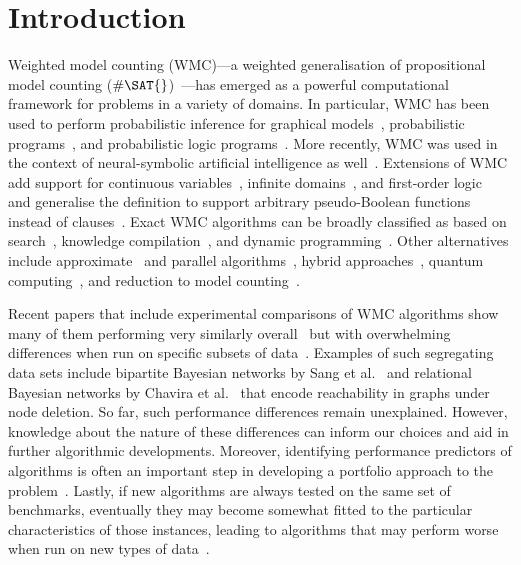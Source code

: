 \documentclass[runningheads]{llncs}
\begin{document}
\section{Introduction}

Weighted model counting (\textsf{WMC})---a weighted generalisation of
propositional model counting
($\#\SAT{}$)~\cite{DBLP:journals/ai/ChaviraD08}---has emerged as a powerful
computational framework for problems in a variety of domains. In particular,
\textsf{WMC} has been used to perform probabilistic inference for graphical
models~\cite{DBLP:conf/ecai/BartKLM16,DBLP:conf/ijcai/ChaviraD05,DBLP:conf/sat/ChaviraD06,DBLP:conf/kr/Darwiche02,DBLP:conf/aaai/SangBK05},
probabilistic programs~\cite{DBLP:journals/pacmpl/HoltzenBM20}, and
probabilistic logic programs~\cite{DBLP:journals/tplp/FierensBRSGTJR15}. More
recently, \textsf{WMC} was used in the context of neural-symbolic artificial
intelligence as well~\cite{DBLP:conf/icml/XuZFLB18}. Extensions of \textsf{WMC}
add support for continuous variables~\cite{DBLP:conf/ijcai/BellePB15}, infinite
domains~\cite{DBLP:conf/aaai/Belle17}, and first-order
logic~\cite{DBLP:journals/cacm/GogateD16,DBLP:conf/ijcai/BroeckTMDR11} and
generalise the definition to support arbitrary pseudo-Boolean functions instead
of clauses~\cite{DBLP:conf/sat/DilkasB21}. Exact \textsf{WMC} algorithms can be
broadly classified as based on
search~\cite{DBLP:conf/sat/SangBBKP04,DBLP:conf/ijcai/SharmaRSM19}, knowledge
compilation~\cite{DBLP:conf/ecai/Darwiche04,DBLP:conf/ijcai/LagniezM17,DBLP:conf/ijcai/OztokD15},
and dynamic programming~\cite{DBLP:conf/aaai/DudekPV20,DBLP:conf/cp/DudekPV20}.
Other alternatives include
approximate~\cite{DBLP:series/faia/ChakrabortyMV21,DBLP:conf/aaai/RenkensKBR14}
and parallel algorithms~\cite{DBLP:conf/pgm/DalLL18,DBLP:conf/esa/FichteHWZ18},
hybrid approaches~\cite{DBLP:conf/sat/HecherTW20}, quantum
computing~\cite{DBLP:conf/ecai/Riguzzi20}, and reduction to model
counting~\cite{DBLP:conf/ijcai/ChakrabortyFMV15}.

Recent papers that include experimental comparisons of \textsf{WMC}
algorithms show many of them performing very similarly
overall~\cite{DBLP:conf/aaai/DudekPV20,DBLP:conf/cp/DudekPV20} but with
overwhelming differences when run on specific subsets of
data~\cite{DBLP:conf/uai/DilkasB21,DBLP:conf/sat/DilkasB21,DBLP:conf/ijcai/LagniezM17}.
Examples of such segregating data sets include bipartite Bayesian networks by
Sang et al.~\cite{DBLP:conf/aaai/SangBK05} and
relational Bayesian networks by
Chavira et al.~\cite{DBLP:journals/ijar/ChaviraDJ06}
that encode reachability in graphs under node deletion. So far, such performance
differences remain unexplained. However, knowledge about the nature of these
differences can inform our choices and aid in further algorithmic developments.
Moreover, identifying performance predictors of algorithms is often an important
step in developing a portfolio approach to the
problem~\cite{DBLP:journals/jair/XuHHL08}. Lastly, if new algorithms are always
tested on the same set of benchmarks, eventually they may become somewhat fitted
to the particular characteristics of those instances, leading to algorithms that
may perform worse when run on new types of
data~\cite{DBLP:conf/cec/HossainALA10}.
\end{document}
